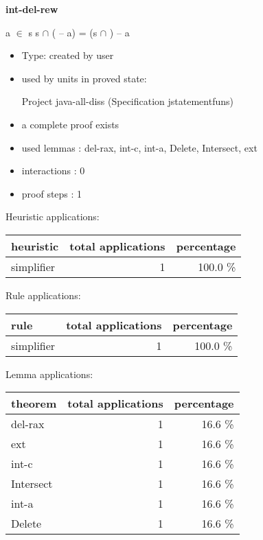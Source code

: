 \documentclass[a4paper]{article}
\begin{document}
{\LARGE\bf int-del-rew}\label{lemma-int-del-rew}

\medskip

 \Fol \Not a $\in$ s \Imp s $\cap$ ( -- a) = (s $\cap$ ) -- a

\begin{itemize}

\item Type: created by user

\item used by units in proved state:

Project java-all-diss (Specification jstatementfuns)
\item       a complete proof exists
\item       used lemmas  : del-rax, int-c, int-a, Delete, Intersect, ext
\item       interactions : 0
\item       proof steps  : 1
\end{itemize}

\medskip


Heuristic applications:

\begin{supertabular}{l|r|r}
heuristic	& total applications & percentage \\ \hline
simplifier & 1 & 100.0 \% \\

\end{supertabular}

Rule applications:

\begin{supertabular}{l|r|r}
rule	        & total applications & percentage \\ \hline
simplifier & 1 & 100.0 \% \\

\end{supertabular}

Lemma applications:

\begin{supertabular}{l|r|r}
theorem	        & total applications & percentage \\ \hline
del-rax & 1 & 16.6 \% \\
ext & 1 & 16.6 \% \\
int-c & 1 & 16.6 \% \\
Intersect & 1 & 16.6 \% \\
int-a & 1 & 16.6 \% \\
Delete & 1 & 16.6 \% \\

\end{supertabular}
\pagebreak
\end{document}
